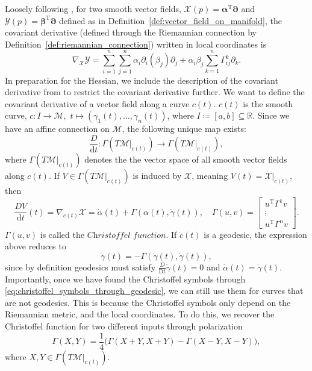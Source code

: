 Loosely following \cite[Appendix~A]{JensenZimmermann2024}, for two smooth vector fields, $\mathcal{X}(p)=\boldsymbol{\alpha}^{\mathrm{T}}\boldsymbol{\partial}$ and $\mathcal{Y}(p)=\boldsymbol{\beta}^{\mathrm{T}}\boldsymbol{\partial}$ defined as in Definition~\ref{def:vector_field_on_manifold}, the covariant derivative (defined through the Riemannian connection by Definition~\ref{def:riemannian_connection}) written in local coordinates is
\begin{equation*}
    \nabla_{\mathcal{X}}\mathcal{Y}=\sum\limits_{i=1}^{n}\sum\limits_{j=1}^{n}\alpha_{i}\partial_{i}(\beta_{j})\partial_{j}+\alpha_{i}\beta_{j}\sum\limits_{k=1}^{n}\Gamma_{ij}^{k}\partial_{k}.
\end{equation*}
In preparation for the Hessian, we include the description of the covariant derivative from \cite[p.~96]{Tu2017} to restrict the covariant derivative further. We want to define the covariant derivative of a vector field along a curve $c(t)$. $c(t)$ is the smooth curve, $c\colon I\xrightarrow{}\mathcal{M},$ $t\mapsto(\gamma_{1}(t), \dots, \gamma_{n}(t))$, where $I \coloneqq [a,b]\subseteq \mathbb{R}$. Since we have an affine connection on $\mathcal{M}$, the following unique map exists:
\begin{equation*}
    \frac{D}{\mathrm{d}t}\colon \Gamma(T \mathcal{M}|_{c(t)})\xrightarrow{}\Gamma(T \mathcal{M}|_{c(t)}),
\end{equation*}
where $\Gamma(T \mathcal{M}|_{c(t)})$ denotes the the vector space of all smooth vector fields along $c(t)$. If $V\in \Gamma(T \mathcal{M}|_{c(t)})$ is induced by $\mathcal{X}$, meaning $V(t)=\mathcal{X}|_{c(t)}$, then
\begin{equation*}
    \frac{DV}{\mathrm{d}t}(t)=\nabla_{\dot{c}(t)}\mathcal{X}=\dot{\alpha}(t)+\Gamma(\alpha(t), \dot{\gamma}(t)),\quad \Gamma(u,v)=\begin{bmatrix}u ^{\mathrm{T}}\Gamma^{1}v \\ \vdots \\ u ^{\mathrm{T}}\Gamma^{n}v\end{bmatrix}.
\end{equation*}
$\Gamma(u,v)$ is called the $\textit{Christoffel function}$. If $\dot{c}(t)$ is a geodesic, the expression above reduces to 
\begin{equation}\label{eq:christoffel_symbols_through_geodesic}
    \ddot{\gamma}(t)=-\Gamma(\dot{\gamma}(t),\dot{\gamma}(t)),
\end{equation}
since by definition geodesics must satisfy $\tfrac{D}{\mathrm{D}t}\dot{\gamma}(t)=0$ and $\dot{\alpha}(t)=\dot{\gamma}(t)$. Importantly, once we have found the Christoffel symbols through \eqref{eq:christoffel_symbols_through_geodesic}, we can still use them for curves that are not geodesics. This is because the Christoffel symbols only depend on the Riemannian metric, and the local coordinates. To do this, we recover the Christoffel function for two different inputs through polarization \cite[p.~312]{Edelman1998} 
\begin{equation*}
    \Gamma(X,Y)=\frac{1}{4}\big(\Gamma(X+Y,X+Y)-\Gamma(X-Y,X-Y)\big),
\end{equation*}
where $X,Y\in \Gamma(T \mathcal{M}|_{c(t)})$. 


